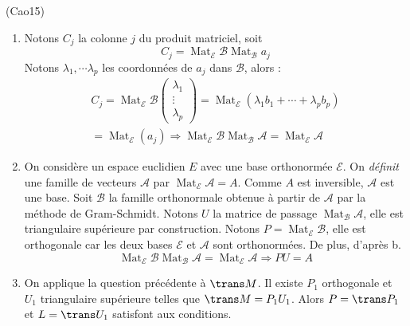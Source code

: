 \begin{tiny}(Cao15)\end{tiny}
\begin{enumerate}
 \item Notons $C_j$ la colonne $j$ du produit matriciel, soit 
\begin{displaymath}
 C_j = \mathop{\mathrm{Mat}}_{\mathcal E}\mathcal{B}\mathop{\mathrm{Mat}}_{\mathcal B}a_j
\end{displaymath}
Notons $\lambda_1,\cdots \lambda_p$ les coordonnées de $a_j$ dans $\mathcal{B}$, alors :
\begin{multline*}
 C_j = \mathop{\mathrm{Mat}}_{\mathcal E}\mathcal{B}
\begin{pmatrix}
 \lambda_1 \\ \vdots \\ \lambda_p
\end{pmatrix}
=\mathop{\mathrm{Mat}}_{\mathcal E}\left(\lambda_1 b_1 + \cdots + \lambda_p b_p \right) \\
= \mathop{\mathrm{Mat}}_{\mathcal E}(a_j)
\Rightarrow 
\mathop{\mathrm{Mat}}_{\mathcal E}\mathcal{B}\mathop{\mathrm{Mat}}_{\mathcal B}\mathcal{A}
=\mathop{\mathrm{Mat}}_{\mathcal E}\mathcal{A}
\end{multline*}

 \item On considère un espace euclidien $E$ avec une base orthonormée $\mathcal{E}$. On \emph{définit} une famille de vecteurs $\mathcal{A}$ par $\mathop{\mathrm{Mat}}_{\mathcal E}\mathcal{A} = A$. Comme $A$ est inversible, $\mathcal{A}$ est une base. Soit $\mathcal{B}$ la famille orthonormale obtenue à partir de $\mathcal{A}$ par la méthode de Gram-Schmidt.\newline
Notons $U$ la matrice de passage $\mathop{\mathrm{Mat}}_{\mathcal B}\mathcal{A}$, elle est triangulaire supérieure par construction.\newline
Notons $P=\mathop{\mathrm{Mat}}_{\mathcal E}\mathcal{B}$, elle est orthogonale car les deux bases $\mathcal{E}$ et $\mathcal{A}$ sont orthonormées. De plus, d'après b.
\begin{displaymath}
\mathop{\mathrm{Mat}}_{\mathcal E}\mathcal{B}\mathop{\mathrm{Mat}}_{\mathcal B}\mathcal{A}
=\mathop{\mathrm{Mat}}_{\mathcal E}\mathcal{A}
\Rightarrow PU=A
\end{displaymath}


 \item On applique la question précédente à $\trans M$. Il existe $P_1$ orthogonale et $U_1$ triangulaire supérieure telles que $\trans M = P_1 U_1$. Alors $P=\trans P_1$ et $L=\trans U_1$ satisfont aux conditions.
\end{enumerate}

